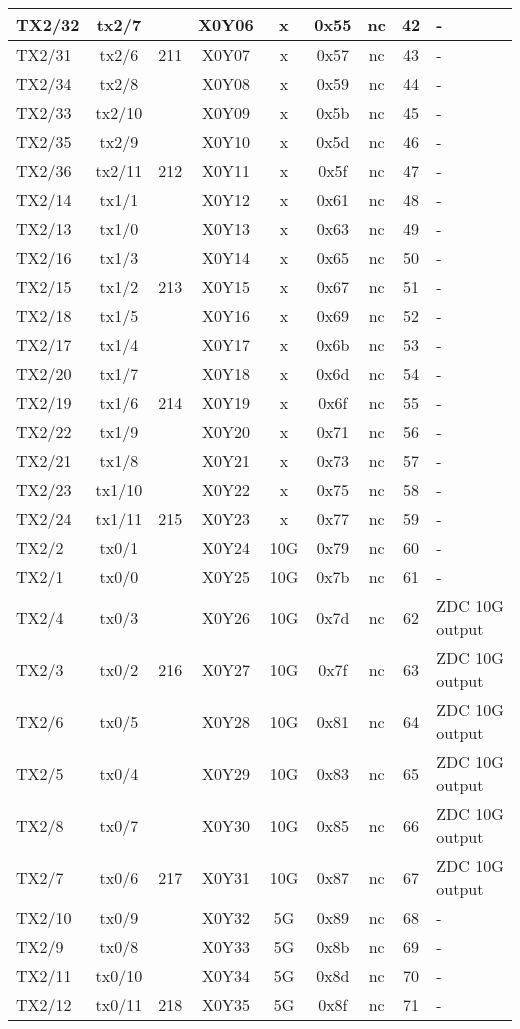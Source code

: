\begin{longtable}{|l|c|c|c|c|c|c|c|l|}
TX2/32 & tx2/7  &     & X0Y06 &  x  & 0x55 & nc & 42 & -\\\hline
TX2/31 & tx2/6  & 211 & X0Y07 &  x  & 0x57 & nc & 43 & -\\\hline
TX2/34 & tx2/8  &     & X0Y08 &  x  & 0x59 & nc & 44 & -\\\hline
TX2/33 & tx2/10 &     & X0Y09 &  x  & 0x5b & nc & 45 & -\\\hline
TX2/35 & tx2/9  &     & X0Y10 &  x  & 0x5d & nc & 46 & -\\\hline
TX2/36 & tx2/11 & 212 & X0Y11 &  x  & 0x5f & nc & 47 & -\\\hline
TX2/14 & tx1/1  &     & X0Y12 &  x  & 0x61 & nc & 48 & -\\\hline
TX2/13 & tx1/0  &     & X0Y13 &  x  & 0x63 & nc & 49 & -\\\hline
TX2/16 & tx1/3  &     & X0Y14 &  x  & 0x65 & nc & 50 & -\\\hline
TX2/15 & tx1/2  & 213 & X0Y15 &  x  & 0x67 & nc & 51 & -\\\hline
TX2/18 & tx1/5  &     & X0Y16 &  x  & 0x69 & nc & 52 & -\\\hline
TX2/17 & tx1/4  &     & X0Y17 &  x  & 0x6b & nc & 53 & -\\\hline
TX2/20 & tx1/7  &     & X0Y18 &  x  & 0x6d & nc & 54 & -\\\hline
TX2/19 & tx1/6  & 214 & X0Y19 &  x  & 0x6f & nc & 55 & -\\\hline
TX2/22 & tx1/9  &     & X0Y20 &  x  & 0x71 & nc & 56 & -\\\hline
TX2/21 & tx1/8  &     & X0Y21 &  x  & 0x73 & nc & 57 & -\\\hline
TX2/23 & tx1/10 &     & X0Y22 &  x  & 0x75 & nc & 58 & -\\\hline
TX2/24 & tx1/11 & 215 & X0Y23 &  x  & 0x77 & nc & 59 & -\\\hline
TX2/2  & tx0/1  &     & X0Y24 & 10G & 0x79 & nc & 60 & -\\\hline
TX2/1  & tx0/0  &     & X0Y25 & 10G & 0x7b & nc & 61 & -\\\hline
TX2/4  & tx0/3  &     & X0Y26 & 10G & 0x7d & nc & 62 & ZDC 10G output\\\hline
TX2/3  & tx0/2  & 216 & X0Y27 & 10G & 0x7f & nc & 63 & ZDC 10G output\\\hline
TX2/6  & tx0/5  &     & X0Y28 & 10G & 0x81 & nc & 64 & ZDC 10G output\\\hline
TX2/5  & tx0/4  &     & X0Y29 & 10G & 0x83 & nc & 65 & ZDC 10G output\\\hline
TX2/8  & tx0/7  &     & X0Y30 & 10G & 0x85 & nc & 66 & ZDC 10G output\\\hline
TX2/7  & tx0/6  & 217 & X0Y31 & 10G & 0x87 & nc & 67 & ZDC 10G output\\\hline
TX2/10 & tx0/9  &     & X0Y32 &  5G & 0x89 & nc & 68 & -\\\hline
TX2/9  & tx0/8  &     & X0Y33 &  5G & 0x8b & nc & 69 & -\\\hline
TX2/11 & tx0/10 &     & X0Y34 &  5G & 0x8d & nc & 70 & -\\\hline
TX2/12 & tx0/11 & 218 & X0Y35 &  5G & 0x8f & nc & 71 & -\\\hline
\end{longtable}
\clearpage

